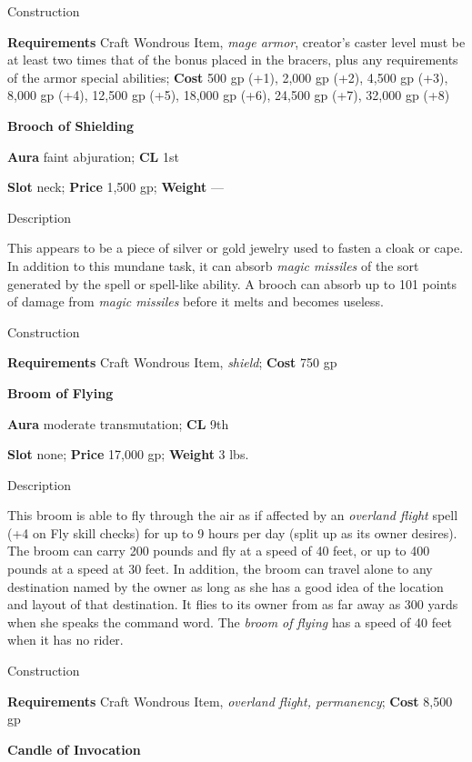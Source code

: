 Construction
				
\textbf{Requirements} Craft Wondrous Item, \textit{mage armor}, creator's caster level must be at least two times that of the bonus placed in the bracers, plus any requirements of the armor special abilities; \textbf{Cost }500 gp (+1), 2,000 gp (+2), 4,500 gp (+3), 8,000 gp (+4), 12,500 gp (+5), 18,000 gp (+6), 24,500 gp (+7), 32,000 gp (+8)
				
\textbf{Brooch of Shielding}
				
\textbf{Aura} faint abjuration;\textbf{ CL }1st
				
\textbf{Slot} neck; \textbf{Price} 1,500 gp; \textbf{Weight }---
				
Description
				
This appears to be a piece of silver or gold jewelry used to fasten a cloak or cape. In addition to this mundane task, it can absorb \textit{magic missiles }of the sort generated by the spell or spell-like ability. A brooch can absorb up to 101 points of damage from \textit{magic missiles }before it melts and becomes useless. 
				
Construction
				
\textbf{Requirements} Craft Wondrous Item, \textit{shield}; \textbf{Cost }750 gp
				
\textbf{Broom of Flying}
				
\textbf{Aura} moderate transmutation;\textbf{ CL }9th
				
\textbf{Slot} none; \textbf{Price} 17,000 gp; \textbf{Weight} 3 lbs.
				
Description
				
This broom is able to fly through the air as if affected by an\textit{ overland flight }spell (+4 on Fly skill checks) for up to 9 hours per day (split up as its owner desires). The broom can carry 200 pounds and fly at a speed of 40 feet, or up to 400 pounds at a speed at 30 feet. In addition, the broom can travel alone to any destination named by the owner as long as she has a good idea of the location and layout of that destination. It flies to its owner from as far away as 300 yards when she speaks the command word. The \textit{broom of flying }has a speed of 40 feet when it has no rider. 
				
Construction
				
\textbf{Requirements} Craft Wondrous Item, \textit{overland flight, permanency}; \textbf{Cost }8,500 gp
				
\textbf{Candle of Invocation}
				
